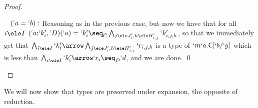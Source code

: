 \documentclass{lmcs}
\begin{document}
\begin{proof}
\begin{description}
~\kern-10mm $(`a = `b) : $
Reasoning as in the previous case, but now we have that for all $i\ele I$
$(`a{:}`k'_i,`D)(`a) = `k'_i \seq_C \bigwedge_{j\ele J'_i,h\ele H'_{i,j}} `k'_{i,j,h}$, so that we immediately
get that $\bigwedge_{i\ele I} `k'_i\arrow\bigwedge_{j\ele J'_i,h\ele H'_{i,j}}`r_{i,j,h}$ is a type of 
$`m`a.\textrm{\sf C}[`b/`g]$ which is less
than $\bigwedge_{i\ele I} `k'_i\arrow`r_i \seq_D `d$, and we are done.
\qed

 \end{description}
 \end{proof}


We will now show that types are preserved under expansion, the opposite of reduction.
\end{document}
